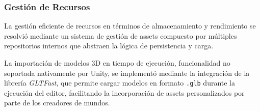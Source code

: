 \subsubsection{Gestión de Recursos}

La gestión eficiente de recursos en términos de almacenamiento y rendimiento se resolvió mediante un sistema de 
gestión de assets compuesto por múltiples repositorios internos que abstraen la lógica de persistencia y carga.

La importación de modelos 3D en tiempo de ejecución, funcionalidad no soportada nativamente por Unity, se implementó 
mediante la integración de la librería \textit{GLTFast}, que permite cargar modelos en formato \texttt{.glb} durante 
la ejecución del editor, facilitando la incorporación de assets personalizados por parte de los creadores de mundos.


